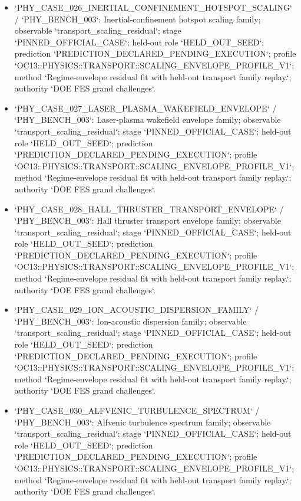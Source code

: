 \begin{itemize}
\item `PHY\_CASE\_026\_INERTIAL\_CONFINEMENT\_HOTSPOT\_SCALING` / `PHY\_BENCH\_003`: Inertial-confinement hotspot scaling family; observable `transport\_scaling\_residual`; stage `PINNED\_OFFICIAL\_CASE`; held-out role `HELD\_OUT\_SEED`; prediction `PREDICTION\_DECLARED\_PENDING\_EXECUTION`; profile `OC13::PHYSICS::TRANSPORT::SCALING\_ENVELOPE\_PROFILE\_V1`; method `Regime-envelope residual fit with held-out transport family replay.`; authority `DOE FES grand challenges`.
\item `PHY\_CASE\_027\_LASER\_PLASMA\_WAKEFIELD\_ENVELOPE` / `PHY\_BENCH\_003`: Laser-plasma wakefield envelope family; observable `transport\_scaling\_residual`; stage `PINNED\_OFFICIAL\_CASE`; held-out role `HELD\_OUT\_SEED`; prediction `PREDICTION\_DECLARED\_PENDING\_EXECUTION`; profile `OC13::PHYSICS::TRANSPORT::SCALING\_ENVELOPE\_PROFILE\_V1`; method `Regime-envelope residual fit with held-out transport family replay.`; authority `DOE FES grand challenges`.
\item `PHY\_CASE\_028\_HALL\_THRUSTER\_TRANSPORT\_ENVELOPE` / `PHY\_BENCH\_003`: Hall thruster transport envelope family; observable `transport\_scaling\_residual`; stage `PINNED\_OFFICIAL\_CASE`; held-out role `HELD\_OUT\_SEED`; prediction `PREDICTION\_DECLARED\_PENDING\_EXECUTION`; profile `OC13::PHYSICS::TRANSPORT::SCALING\_ENVELOPE\_PROFILE\_V1`; method `Regime-envelope residual fit with held-out transport family replay.`; authority `DOE FES grand challenges`.
\item `PHY\_CASE\_029\_ION\_ACOUSTIC\_DISPERSION\_FAMILY` / `PHY\_BENCH\_003`: Ion-acoustic dispersion family; observable `transport\_scaling\_residual`; stage `PINNED\_OFFICIAL\_CASE`; held-out role `HELD\_OUT\_SEED`; prediction `PREDICTION\_DECLARED\_PENDING\_EXECUTION`; profile `OC13::PHYSICS::TRANSPORT::SCALING\_ENVELOPE\_PROFILE\_V1`; method `Regime-envelope residual fit with held-out transport family replay.`; authority `DOE FES grand challenges`.
\item `PHY\_CASE\_030\_ALFVENIC\_TURBULENCE\_SPECTRUM` / `PHY\_BENCH\_003`: Alfvenic turbulence spectrum family; observable `transport\_scaling\_residual`; stage `PINNED\_OFFICIAL\_CASE`; held-out role `HELD\_OUT\_SEED`; prediction `PREDICTION\_DECLARED\_PENDING\_EXECUTION`; profile `OC13::PHYSICS::TRANSPORT::SCALING\_ENVELOPE\_PROFILE\_V1`; method `Regime-envelope residual fit with held-out transport family replay.`; authority `DOE FES grand challenges`.
\end{itemize}


